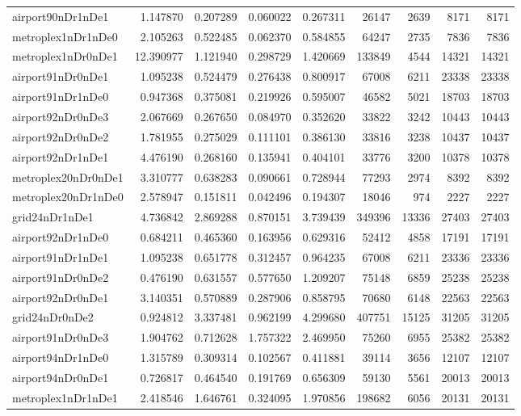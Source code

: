 \begin{longtable}{|l|r|r|r|r|r|r|r|r|}
airport90nDr1nDe1 & 1.147870 & 0.207289 & 0.060022 & 0.267311 & 26147 & 2639 & 8171 & 8171 \\
metroplex1nDr1nDe0 & 2.105263 & 0.522485 & 0.062370 & 0.584855 & 64247 & 2735 & 7836 & 7836 \\
metroplex1nDr0nDe1 & 12.390977 & 1.121940 & 0.298729 & 1.420669 & 133849 & 4544 & 14321 & 14321 \\
airport91nDr0nDe1 & 1.095238 & 0.524479 & 0.276438 & 0.800917 & 67008 & 6211 & 23338 & 23338 \\
airport91nDr1nDe0 & 0.947368 & 0.375081 & 0.219926 & 0.595007 & 46582 & 5021 & 18703 & 18703 \\
airport92nDr0nDe3 & 2.067669 & 0.267650 & 0.084970 & 0.352620 & 33822 & 3242 & 10443 & 10443 \\
airport92nDr0nDe2 & 1.781955 & 0.275029 & 0.111101 & 0.386130 & 33816 & 3238 & 10437 & 10437 \\
airport92nDr1nDe1 & 4.476190 & 0.268160 & 0.135941 & 0.404101 & 33776 & 3200 & 10378 & 10378 \\
metroplex20nDr0nDe1 & 3.310777 & 0.638283 & 0.090661 & 0.728944 & 77293 & 2974 & 8392 & 8392 \\
metroplex20nDr1nDe0 & 2.578947 & 0.151811 & 0.042496 & 0.194307 & 18046 & 974 & 2227 & 2227 \\
grid24nDr1nDe1 & 4.736842 & 2.869288 & 0.870151 & 3.739439 & 349396 & 13336 & 27403 & 27403 \\
airport92nDr1nDe0 & 0.684211 & 0.465360 & 0.163956 & 0.629316 & 52412 & 4858 & 17191 & 17191 \\
airport91nDr1nDe1 & 1.095238 & 0.651778 & 0.312457 & 0.964235 & 67008 & 6211 & 23336 & 23336 \\
airport91nDr0nDe2 & 0.476190 & 0.631557 & 0.577650 & 1.209207 & 75148 & 6859 & 25238 & 25238 \\
airport92nDr0nDe1 & 3.140351 & 0.570889 & 0.287906 & 0.858795 & 70680 & 6148 & 22563 & 22563 \\
grid24nDr0nDe2 & 0.924812 & 3.337481 & 0.962199 & 4.299680 & 407751 & 15125 & 31205 & 31205 \\
airport91nDr0nDe3 & 1.904762 & 0.712628 & 1.757322 & 2.469950 & 75260 & 6955 & 25382 & 25382 \\
airport94nDr1nDe0 & 1.315789 & 0.309314 & 0.102567 & 0.411881 & 39114 & 3656 & 12107 & 12107 \\
airport94nDr0nDe1 & 0.726817 & 0.464540 & 0.191769 & 0.656309 & 59130 & 5561 & 20013 & 20013 \\
metroplex1nDr1nDe1 & 2.418546 & 1.646761 & 0.324095 & 1.970856 & 198682 & 6056 & 20131 & 20131 \\

\end{longtable}
